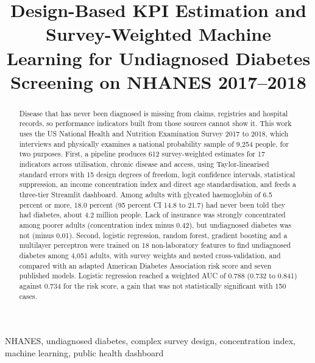 \documentclass[conference,a4paper]{IEEEtran}
\begin{document}
\title{Design-Based KPI Estimation and Survey-Weighted Machine Learning for Undiagnosed Diabetes Screening on NHANES 2017--2018}

\author{
}

\maketitle

\begin{abstract}
Disease that has never been diagnosed is missing from claims, registries and hospital records, so performance indicators built from those sources cannot show it. This work uses the US National Health and Nutrition Examination Survey 2017 to 2018, which interviews and physically examines a national probability sample of 9,254 people, for two purposes. First, a pipeline produces 612 survey-weighted estimates for 17 indicators across utilisation, chronic disease and access, using Taylor-linearised standard errors with 15 design degrees of freedom, logit confidence intervals, statistical suppression, an income concentration index and direct age standardisation, and feeds a three-tier Streamlit dashboard. Among adults with glycated haemoglobin of 6.5 percent or more, 18.0 percent (95 percent CI 14.8 to 21.7) had never been told they had diabetes, about 4.2 million people. Lack of insurance was strongly concentrated among poorer adults (concentration index minus 0.42), but undiagnosed diabetes was not (minus 0.01). Second, logistic regression, random forest, gradient boosting and a multilayer perceptron were trained on 18 non-laboratory features to find undiagnosed diabetes among 4,051 adults, with survey weights and nested cross-validation, and compared with an adapted American Diabetes Association risk score and seven published models. Logistic regression reached a weighted AUC of 0.788 (0.732 to 0.841) against 0.734 for the risk score, a gain that was not statistically significant with 150 cases.
\end{abstract}

\begin{IEEEkeywords}
NHANES, undiagnosed diabetes, complex survey design, concentration index, machine learning, public health dashboard
\end{IEEEkeywords}








\end{document}
